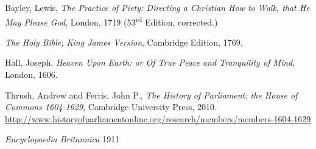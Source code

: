 \begin{thebibliography}{9}

        Bayley, Lewis,
        \textit{The Practice of Piety: Directing a Christian How to Walk, that He May Please God},
        London,
        1719 (53\textsuperscript{rd} Edition, corrected.)


        \textit{The Holy Bible, King James Version},
        Cambridge Edition,
        1769.

        Hall, Joseph,
        \textit{Heaven Upon Earth: or Of True Peace and Tranquility of Mind},
        London,
        1606.
    
        Thrush, Andrew and Ferris, John P.,
        \textit{The History of Parliament: the House of Commons 1604-1629},
        Cambridge University Press,
        2010.
        \url{http://www.historyofparliamentonline.org/research/members/members-1604-1629}

        \textit{Encyclopaedia Britannica}
        1911


\end{thebibliography}